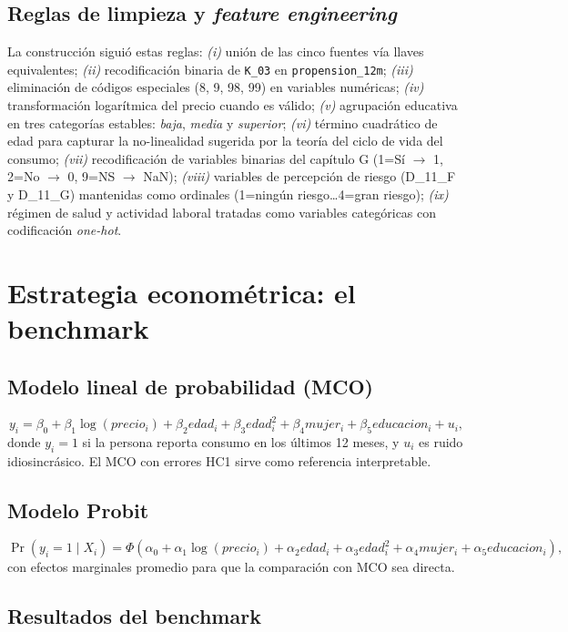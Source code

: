\documentclass[12pt, a4paper]{article}
\begin{document}
\subsection{Reglas de limpieza y \textit{feature engineering}}

La construcción siguió estas reglas: \emph{(i)} unión de las cinco fuentes vía llaves equivalentes; \emph{(ii)} recodificación binaria de \texttt{K\_03} en \texttt{propension\_12m}; \emph{(iii)} eliminación de códigos especiales (8, 9, 98, 99) en variables numéricas; \emph{(iv)} transformación logarítmica del precio cuando es válido; \emph{(v)} agrupación educativa en tres categorías estables: \textit{baja}, \textit{media} y \textit{superior}; \emph{(vi)} término cuadrático de edad para capturar la no-linealidad sugerida por la teoría del ciclo de vida del consumo; \emph{(vii)} recodificación de variables binarias del capítulo G (1=Sí $\to$ 1, 2=No $\to$ 0, 9=NS $\to$ NaN); \emph{(viii)} variables de percepción de riesgo (D\_11\_F y D\_11\_G) mantenidas como ordinales (1=ningún riesgo\ldots 4=gran riesgo); \emph{(ix)} régimen de salud y actividad laboral tratadas como variables categóricas con codificación \textit{one-hot}.

\section{Estrategia econométrica: el benchmark}\label{sec:benchmark}

\subsection{Modelo lineal de probabilidad (MCO)}

\[
y_i = \beta_0 + \beta_1 \log(precio_i) + \beta_2 edad_i + \beta_3 edad_i^2 + \beta_4 mujer_i + \beta_5 educacion_i + u_i,
\]
donde \(y_i=1\) si la persona reporta consumo en los últimos 12 meses, y \(u_i\) es ruido idiosincrásico. El MCO con errores HC1 sirve como referencia interpretable.

\subsection{Modelo Probit}

\[
\Pr(y_i=1 \mid X_i) = \Phi(\alpha_0 + \alpha_1 \log(precio_i) + \alpha_2 edad_i + \alpha_3 edad_i^2 + \alpha_4 mujer_i + \alpha_5 educacion_i),
\]
con efectos marginales promedio para que la comparación con MCO sea directa.

\subsection{Resultados del benchmark}
\end{document}
